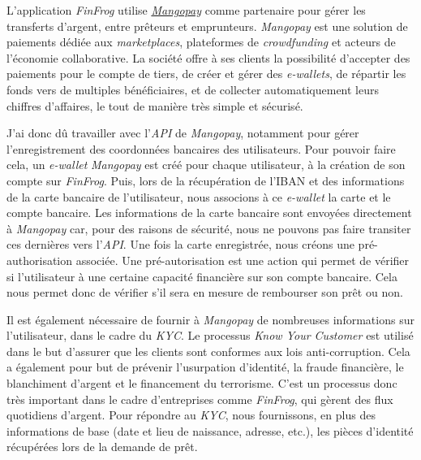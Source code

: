 \documentclass[12pt,a4paper]{article}
\begin{document}
  L'application \emph{FinFrog} utilise
  \href{https://www.mangopay.com/fr/}{\emph{Mangopay}} comme partenaire
  pour gérer les transferts d'argent, entre prêteurs et emprunteurs.
  \emph{Mangopay} est une solution de paiements dédiée aux
  \emph{marketplaces}, plateformes de \emph{crowdfunding} et acteurs de
  l'économie collaborative. La société offre à ses clients la possibilité
  d'accepter des paiements pour le compte de tiers, de créer et gérer des
  \emph{e-wallets}, de répartir les fonds vers de multiples bénéficiaires,
  et de collecter automatiquement leurs chiffres d'affaires, le tout de
  manière très simple et sécurisé.

  \bigskip

  J'ai donc dû travailler avec l'\emph{API} de \emph{Mangopay}, notamment
  pour gérer l'enregistrement des coordonnées bancaires des utilisateurs.
  Pour pouvoir faire cela, un \emph{e-wallet} \emph{Mangopay} est créé
  pour chaque utilisateur, à la création de son compte sur \emph{FinFrog}.
  Puis, lors de la récupération de l'IBAN et des informations de la carte
  bancaire de l'utilisateur, nous associons à ce \emph{e-wallet} la carte
  et le compte bancaire. Les informations de la carte bancaire sont
  envoyées directement à \emph{Mangopay} car, pour des raisons de
  sécurité, nous ne pouvons pas faire transiter ces dernières vers
  l'\emph{API}. Une fois la carte enregistrée, nous créons une
  pré-authorisation associée. Une pré-autorisation est une action qui
  permet de vérifier si l'utilisateur à une certaine capacité financière
  sur son compte bancaire. Cela nous permet donc de vérifier s'il sera en
  mesure de rembourser son prêt ou non.

  \bigskip

  Il est également nécessaire de fournir à \emph{Mangopay} de nombreuses
  informations sur l'utilisateur, dans le cadre du \emph{KYC}. Le
  processus \emph{Know Your Customer} est utilisé dans le but d'assurer
  que les clients sont conformes aux lois anti-corruption. Cela a
  également pour but de prévenir l'usurpation d'identité, la fraude
  financière, le blanchiment d'argent et le financement du terrorisme.
  C'est un processus donc très important dans le cadre d'entreprises comme
  \emph{FinFrog}, qui gèrent des flux quotidiens d'argent. Pour répondre
  au \emph{KYC}, nous fournissons, en plus des informations de base (date
  et lieu de naissance, adresse, etc.), les pièces d'identité récupérées
  lors de la demande de prêt.

  \bigskip
\end{document}
